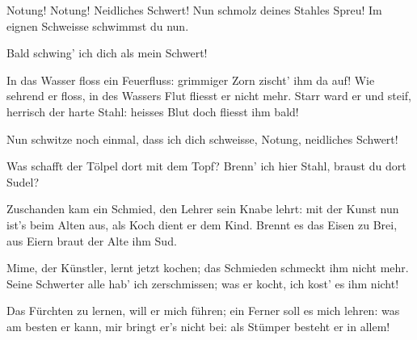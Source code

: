 \begin{drama}
\Siegfriedspeaks

Notung! Notung!
Neidliches Schwert!
Nun schmolz deines Stahles Spreu!
Im eignen Schweisse
schwimmst du nun.


Bald schwing' ich dich als mein Schwert!


In das Wasser floss
ein Feuerfluss:
grimmiger Zorn
zischt' ihm da auf!
Wie sehrend er floss,
in des Wassers Flut
fliesst er nicht mehr.
Starr ward er und steif,
herrisch der harte Stahl:
heisses Blut doch
fliesst ihm bald!


Nun schwitze noch einmal,
dass ich dich schweisse,
Notung, neidliches Schwert!



Was schafft der Tölpel
dort mit dem Topf?
Brenn' ich hier Stahl,
braust du dort Sudel?

\Mimespeaks

Zuschanden kam ein Schmied,
den Lehrer sein Knabe lehrt:
mit der Kunst nun ist's beim Alten aus,
als Koch dient er dem Kind.
Brennt es das Eisen zu Brei,
aus Eiern braut
der Alte ihm Sud.


\Siegfriedspeaks

Mime, der Künstler,
lernt jetzt kochen;
das Schmieden schmeckt ihm nicht mehr.
Seine Schwerter alle
hab' ich zerschmissen;
was er kocht, ich kost' es ihm nicht!


Das Fürchten zu lernen,
will er mich führen;
ein Ferner soll es mich lehren:
was am besten er kann,
mir bringt er's nicht bei:
als Stümper besteht er in allem!


\end{drama}
